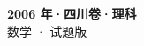 \documentclass[zihao=-4, a4paper]{ctexart}
\begin{document}
\begin{center}
  {\Large\bfseries 2006 年·四川卷·理科}\\[4pt]
  {\large 数学 · 试题版}
\end{center}
\medskip
{}

\end{document}
